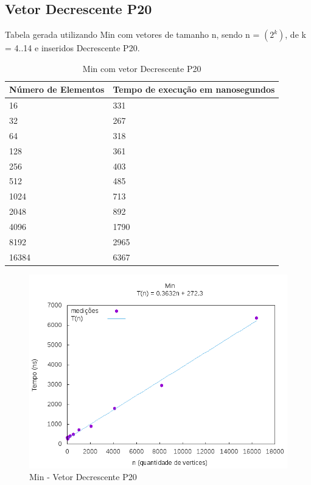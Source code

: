 \documentclass[12pt,a4paper,twoside]{report}
\begin{document}
\subsection{Vetor Decrescente P20}
Tabela gerada utilizando Min com vetores de tamanho n, sendo n = $(2^k)$, de k = 4..14 e inseridos Decrescente P20.
\begin{table}[H]
\centering
\caption{Min com vetor Decrescente P20}
\label{my-label}
\begin{tabular}{|l|l|}
\hline
\multicolumn{1}{|c|}{\textbf{Número de Elementos}} & \multicolumn{1}{c|}{\textbf{Tempo de execução em nanosegundos}} \\ \hline
16 & 331 \\ \hline
32 & 267 \\ \hline
64 & 318 \\ \hline
128 & 361 \\ \hline
256 & 403 \\ \hline
512 & 485 \\ \hline
1024 & 713 \\ \hline
2048 & 892 \\ \hline
4096 & 1790 \\ \hline
8192 & 2965 \\ \hline
16384 & 6367 \\ \hline

\end{tabular}
\end{table}

\begin{figure}[H]
    \centering
    \includegraphics[width=0.7\linewidth]{graficos/Min/Decrescente P20/Min.png}
  \caption{Min - Vetor Decrescente P20}
\end{figure}
\end{document}
